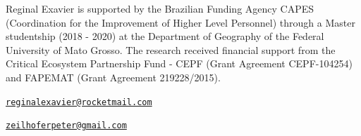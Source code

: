 Reginal Exavier is supported by the Brazilian Funding Agency CAPES
(Coordination for the Improvement of Higher Level Personnel) through a
Master studentship (2018 - 2020) at the Department of Geography of the
Federal University of Mato Grosso. The research received financial support from the Critical Ecosystem Partnership Fund - CEPF (Grant Agreement CEPF-104254) and FAPEMAT (Grant Agreement 219228/2015).




\address{%
Reginal Exavier\\
Department of Geography\\
Federal University of Mato Grosso\\ Avenida Fernando Corrêa da Costa, 2367 -- Boa Esperança, Cuiabá -- MT,
78060-900\\
ORCiD: 0000-0002-5237-523X\\
}
\href{mailto:reginalexavier@rocketmail.com}{\nolinkurl{reginalexavier@rocketmail.com}}

\address{%
Peter Zeilhofer\\
Department of Geography\\
Federal University of Mato Grosso\\ Avenida Fernando Corrêa da Costa, 2367 -- Boa Esperança, Cuiabá -- MT,
78060-900\\
}
\href{mailto:zeilhoferpeter@gmail.com}{\nolinkurl{zeilhoferpeter@gmail.com}}

